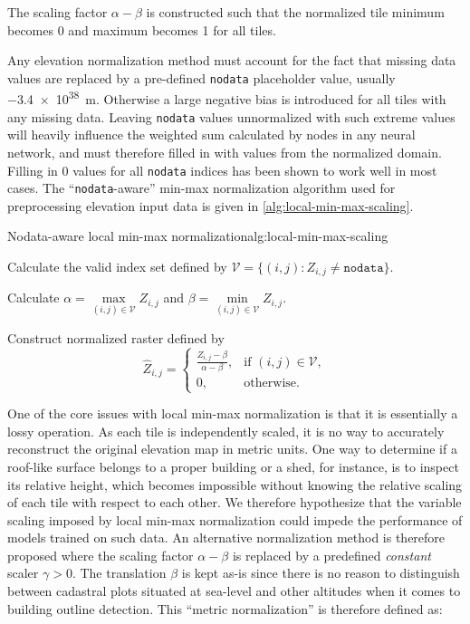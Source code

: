 The scaling factor $\alpha - \beta$ is constructed such that the normalized tile minimum becomes 0 and maximum becomes 1 for all tiles.

Any elevation normalization method must account for the fact that missing data values are replaced by a pre-defined \texttt{nodata} placeholder value, usually \SI{-3.4e38}{\meter}.
Otherwise a large negative bias is introduced for all tiles with any missing data.
Leaving \texttt{nodata} values unnormalized with such extreme values will heavily influence the weighted sum calculated by nodes in any neural network, and must therefore filled in with values from the normalized domain.
Filling in $0$ values for all \texttt{nodata} indices has been shown to work well in most cases.
The \enquote{\texttt{nodata}-aware} min-max normalization algorithm used for preprocessing elevation input data is given in \cref{alg:local-min-max-scaling}.

\begin{algorithm}{Nodata-aware local min-max normalization}{alg:local-min-max-scaling}
  \item Calculate the valid index set defined by $\mathcal{V} = \{(i, j): Z_{i,j} \neq \texttt{nodata}\}$.
  \item Calculate $\alpha = \underset{(i,j) \in \mathcal{V}}{\max} Z_{i,j}$ and $\beta = \underset{(i,j) \in \mathcal{V}}{\min} Z_{i,j}$.
  \item Construct normalized raster defined by
    \begin{equation*}
        \hat{Z}_{i,j} = \begin{cases}
          \frac{Z_{i,j} - \beta}{\alpha - \beta}, & \text{if } (i,j) \in \mathcal{V}, \\
          0, & \text{otherwise.}
        \end{cases}
    \end{equation*}
\end{algorithm}

One of the core issues with local min-max normalization is that it is essentially a lossy operation.
As each tile is independently scaled, it is no way to accurately reconstruct the original elevation map in metric units.
One way to determine if a roof-like surface belongs to a proper building or a shed, for instance, is to inspect its relative height, which becomes impossible without knowing the relative scaling of each tile with respect to each other.
We therefore hypothesize that the variable scaling imposed by local min-max normalization could impede the performance of models trained on such data.
An alternative normalization method is therefore proposed where the scaling factor $\alpha - \beta$ is replaced by a predefined \textit{constant} scaler $\gamma > 0$.
The translation $\beta$ is kept as-is since there is no reason to distinguish between cadastral plots situated at sea-level and other altitudes when it comes to building outline detection.
This \enquote{metric normalization} is therefore defined as:

